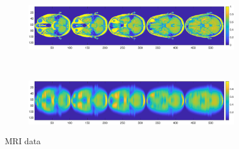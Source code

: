 \documentclass[12pt]{article}
\newcommand{\ctrans}[1]{{#1}^\mathsf{H}}	%
\DeclareMathOperator{\diag}{diag}	%
\newcommand{\dft}[1]{\widehat{#1}}	%
\begin{document}
\begin{figure}[ht]
\begin{subfigure}{\textwidth}
\includegraphics[scale=0.36]{Figures/Full-MRI}
\subcaption{}
\end{subfigure} \\
\begin{subfigure}{\textwidth}
\includegraphics[scale=0.36]{Figures/Blurred-MRI}
\subcaption{}
\end{subfigure}
\caption{MRI data}
\label{fig:MRI 1D}
\end{figure}


  






\end{document}
